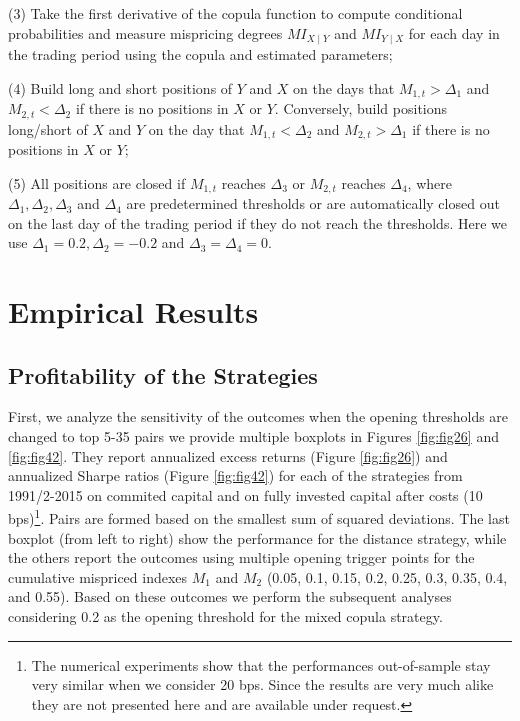 \documentclass[a4paper]{article}
\begin{document}
	\vspace{0.3cm}
	\vspace{0.3cm}
	
	(3) Take the first derivative of the copula function to compute conditional
		probabilities and measure mispricing degrees $MI_{X\mid Y}$ and $MI_{Y\mid X}$ for each day in the trading period using the copula and estimated parameters;
		
	\vspace{0.3cm}
	\vspace{0.3cm}
		
	(4) Build long and short positions of $Y$ and $X$ on the days that $M_{1,t}>\Delta_{1}$ and $M_{2,t}<\Delta_{2}$ if there is no positions in $X$ or $Y$. Conversely, build positions long/short of $X$ and $Y$ on the day that $M_{1,t}<\Delta_{2}$ and $M_{2,t}>\Delta_{1}$ if there is no positions in $X$ or $Y$;
	
	\vspace{0.3cm}
	\vspace{0.3cm}
		
	(5) All positions are closed if $M_{1,t}$ reaches $\Delta_{3}$ or $M_{2,t}$ reaches $\Delta_{4}$, where $\Delta_{1},\Delta_{2},\Delta_{3}$ and $\Delta_{4}$ are predetermined thresholds or are automatically closed out on the last day of the trading period if they do not reach the thresholds. Here we use $\Delta_{1}=0.2, \Delta_{2}=-0.2$ and $\Delta_{3}=\Delta_{4}=0$.
	
	
	\vspace{0.6cm}
	
	\section{Empirical Results}
	
	\vspace{0.3cm}
	
	\subsection{Profitability of the Strategies}
	
First, we analyze the sensitivity of the outcomes when the opening thresholds are changed to top 5-35 pairs we provide multiple boxplots in Figures \ref{fig:fig26} and \ref{fig:fig42}. They report annualized excess returns (Figure \ref{fig:fig26}) and annualized Sharpe ratios (Figure \ref{fig:fig42}) for each of the strategies from 1991/2-2015 on commited capital and on fully invested capital after costs (10 bps)\footnote{The numerical experiments show that the performances out-of-sample stay very similar when we consider 20 bps. Since the results are very much alike they are not presented here and are available under request.}. Pairs are formed based on the smallest sum of squared deviations. The last boxplot (from left to right) show the performance for the distance strategy, while the others report the outcomes using multiple opening trigger points for the cumulative mispriced indexes $M_{1}$ and $M_{2}$ (0.05, 0.1, 0.15, 0.2, 0.25, 0.3, 0.35, 0.4, and 0.55). Based on these outcomes we perform the subsequent analyses considering 0.2 as the opening threshold for the mixed copula strategy.
\end{document}
